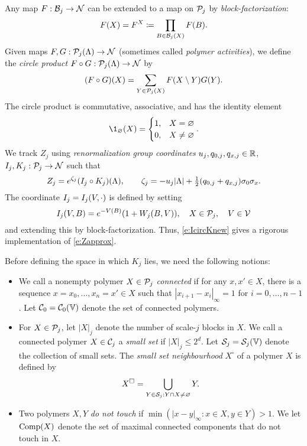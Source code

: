 Any map $F : \mathcal{B}_j \rightarrow \mathcal{N}$ can be extended to a map on $\mathcal{P}_j$ by \emph{block-factorization}:
\begin{equation}
\label{e:block-fact}
F(X) = F^X \coloneqq \prod_{B\in\mathcal{B}_j(X)} F(B).
\end{equation}
Given maps $F, G : \mathcal{P}_j(\Lambda) \rightarrow \mathcal{N}$ (sometimes called \emph{polymer activities}),
we define the \emph{circle product} $F \circ G : \mathcal{P}_j(\Lambda) \rightarrow \mathcal{N}$ by
\begin{equation}
\label{e:circ}
(F \circ G)(X) = \sum_{Y\in\mathcal{P}_j(X)} F(X \setminus Y) G(Y).
\end{equation}
The circle product is commutative, associative, and has the identity element
\begin{equation}
\1_\varnothing(X) =
\begin{cases}
1,	& X = \varnothing \\
0,	& X \ne \varnothing
\end{cases}.
\end{equation}
We track $Z_j$ using \emph{renormalization group coordinates}
$u_j, q_{0,j}, q_{x,j} \in {\mathbb R}$,
$I_j, K_j : \mathcal{P}_j \rightarrow \mathcal{N}$ such that
\begin{equation}
\label{e:IcircKnew}
Z_j = e^{\zeta_j}(I_j\circ K_j)(\Lambda),
	\qquad
\zeta_j
	=
- u_j|\Lambda|
+ \textstyle{\frac 12} (q_{0,j} + q_{x,j}) \sigma_0\sigma_x
.
\end{equation}
The coordinate $I_j = I_j(V, \cdot)$ is defined by setting
\begin{equation}
\label{e:Idef}
I_j(V, B)
	=
e^{-V(B)} (1 + W_j(B, V)), \quad X \in \mathcal{P}_j,
	\quad
V \in \mathcal{V}
\end{equation}
and extending this by block-factorization.
Thus, \eqref{e:IcircKnew} gives a rigorous implementation of \eqref{e:Zapprox}.

Before defining the space in which $K_j$ lies, we need the following notions:
\begin{itemize}
\item
We call a nonempty polymer $X\in \mathcal{P}_j$ \emph{connected}
if for any $x, x' \in X$, there is a sequence
$x = x_0, \ldots, x_n = x' \in X$ such that
$|x_{i+1} - x_i|_\infty = 1$ for $i = 0, \ldots, n - 1$.
Let $\mathcal{C}_0 = \mathcal{C}_0(\mathbb{V})$ denote the set of connected polymers.

\item
For $X \in \mathcal{P}_j$, let $|X|_j$ denote the number of scale-$j$ blocks in $X$.
We call a connected polymer $X\in\mathcal{C}_j$ a \emph{small set} if $|X|_j \le 2^d$.
Let $\mathcal{S}_j = \mathcal{S}_j(\mathbb{V})$ denote the collection of small sets.
The \emph{small set neighbourhood} $X^\square$ of a polymer $X$ is defined by
\begin{equation}
\label{e:ssn}
X^\Box = \bigcup_{Y\in\mathcal{S}_j : Y \cap X \ne \varnothing} Y.
\end{equation}

\item
Two polymers $X, Y$ \emph{do not touch} if $\min(|x - y|_\infty : x \in X, y \in Y) > 1$.
We let ${\rm Comp}(X)$ denote the set of maximal connected components that do not touch
in $X$.
\end{itemize}

